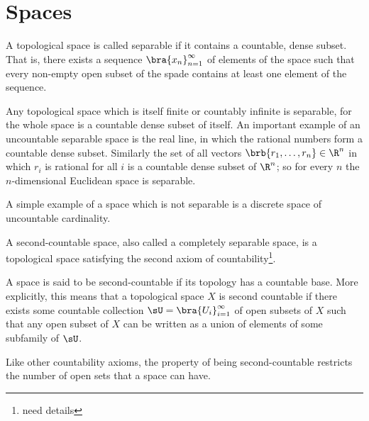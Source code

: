\section{Spaces}

\begin{definition}\label{def:separable_space}
A topological space is called separable if it contains a countable, dense subset. That is, there exists a sequence $\bra{x_n}_{n=1}^\infty$ of elements of the space such that every non-empty open subset of the spade contains at least one element of the sequence.
\end{definition}

\begin{remark}
Any topological space which is itself finite or countably infinite is separable, for the whole space is a countable dense subset of itself. An important example of an uncountable separable space is the real line, in which the rational numbers form a countable dense subset. Similarly the set of all vectors $\brb{r_{1},\ldots ,r_{n}}\in \R^n$ in which $r_{i}$ is rational for all $i$ is a countable dense subset of $\R^n$; so for every $n$ the $n$-dimensional Euclidean space is separable.

A simple example of a space which is not separable is a discrete space of uncountable cardinality.
\end{remark}


\begin{definition}\label{def:second_countable_space}
A second-countable space, also called a completely separable space, is a topological space satisfying the second axiom of countability\footnote{need details}.

A space is said to be second-countable if its topology has a countable base. More explicitly, this means that a topological space $X$ is second countable if there exists some countable collection $\sU = \bra{U_i}_{i=1}^\infty$ of open subsets of $X$ such that any open subset of $X$ can be written as a union of elements of some subfamily of $\sU$.
\end{definition}

\begin{remark}
Like other countability axioms, the property of being second-countable restricts the number of open sets that a space can have.
\end{remark}

